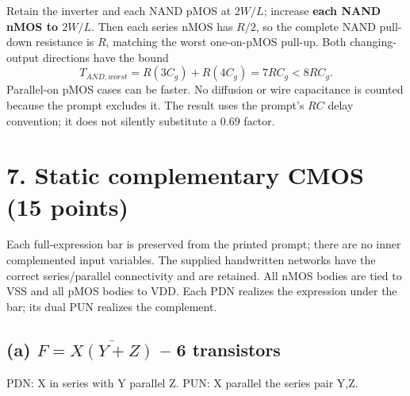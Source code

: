 \documentclass[10pt]{article}
\newcommand{\mos}[4]{\begin{scope}[shift={(#1,#2)}]
\draw (0,.24)--(0,-.24);\draw (0,.20)--(.25,.20)--(.25,.5);
\draw (0,-.20)--(.25,-.20)--(.25,-.5);\draw (-.16,.23)--(-.16,-.23);
\ifnum#4=1\draw (-.26,0) circle (.06);\draw (-.75,0)--(-.32,0);\else\draw (-.75,0)--(-.16,0);\fi
\node[anchor=east,font=\scriptsize] at (-.76,0) {$#3$};\end{scope}}
\newcommand{\ground}[2]{\draw (#1,#2)--(#1,{#2-.12});\draw ({#1-.17},{#2-.12})--({#1+.17},{#2-.12});\draw ({#1-.11},{#2-.20})--({#1+.11},{#2-.20});}
\newcommand{\rail}[3]{\draw (#1,#2)--(#1,{#2+.14});\node[above,font=\scriptsize] at (#1,{#2+.14}) {$#3$};}
\begin{document}
Retain the inverter and each NAND pMOS at $2W/L$; increase \textbf{each NAND nMOS to $2W/L$}. Then each series nMOS has $R/2$, so the complete NAND pull-down resistance is $R$, matching the worst one-on-pMOS pull-up. Both changing-output directions have the bound
\[\boxed{T_{AND,worst}=R(3C_g)+R(4C_g)=7RC_g<8RC_g.}\]
Parallel-on pMOS cases can be faster. No diffusion or wire capacitance is counted because the prompt excludes it. The result uses the prompt's $RC$ delay convention; it does not silently substitute a 0.69 factor.
\begin{center}\end{center}
\newpage\section*{7. Static complementary CMOS (15 points)}
Each full-expression bar is preserved from the printed prompt; there are no inner complemented input variables. The supplied handwritten networks have the correct series/parallel connectivity and are retained. All nMOS bodies are tied to VSS and all pMOS bodies to VDD. Each PDN realizes the expression under the bar; its dual PUN realizes the complement.

\subsection*{(a) $F=\overline{X(Y+Z)}$ -- 6 transistors}
PDN: X in series with Y parallel Z. PUN: X parallel the series pair Y,Z.
\begin{center}\end{center}
\end{document}
